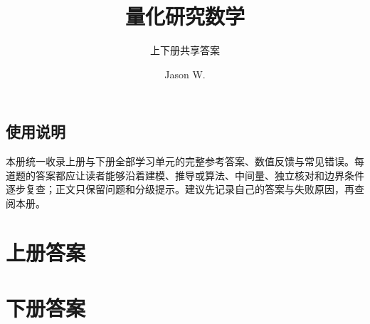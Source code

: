 \documentclass[lang=cn,11pt,scheme=chinese]{elegantbook}
\title{量化研究数学}
\subtitle{上下册共享答案}
\author{Jason W.}
\date{\MFQReleaseDate}
\begin{document}
\maketitle
\frontmatter

\chapter*{使用说明}
本册统一收录上册与下册全部学习单元的完整参考答案、数值反馈与常见错误。每道题的答案都应让读者能够沿着建模、推导或算法、中间量、独立核对和边界条件逐步复查；正文只保留问题和分级提示。建议先记录自己的答案与失败原因，再查阅本册。

\tableofcontents
\mainmatter

\part{上册答案}


















\part{下册答案}




















\end{document}
